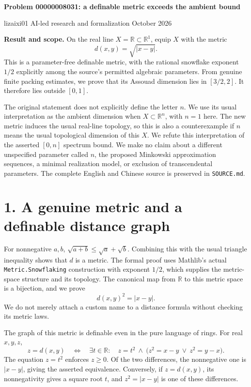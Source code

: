 \documentclass[10pt]{article}
\newcommand{\R}{\mathbb R}
\begin{document}
\begin{center}
{\Large\bfseries Problem 00000008031: a definable metric exceeds the ambient bound}

lizaixi01 \quad AI-led research and formalization  October 2026
\end{center}
\textbf{Result and scope.} On the real line $X=\R\subset\R^1$, equip $X$ with the metric
\[
d(x,y)=\sqrt{|x-y|}.
\]
This is a parameter-free definable metric, with the rational snowflake exponent $1/2$ explicitly among the source's permitted algebraic parameters. From genuine finite packing estimates, we prove that its Assouad dimension lies in $[3/2,2]$. It therefore lies outside $[0,1]$.

The original statement does not explicitly define the letter $n$. We use its usual interpretation as the ambient dimension when $X\subset\R^n$, with $n=1$ here. The new metric induces the usual real-line topology, so this is also a counterexample if $n$ means the usual topological dimension of this $X$. We refute this interpretation of the asserted $[0,n]$ spectrum bound. We make no claim about a different unspecified parameter called $n$, the proposed Minkowski approximation sequences, a minimal realization model, or exclusion of transcendental parameters. The complete English and Chinese source is preserved in \texttt{SOURCE.md}.

\section*{1. A genuine metric and a definable distance graph}
For nonnegative $a,b$, $\sqrt{a+b}\le\sqrt a+\sqrt b$. Combining this with the usual triangle inequality shows that $d$ is a metric. The formal proof uses Mathlib's actual \texttt{Metric.Snowflaking} construction with exponent $1/2$, which supplies the metric-space structure and its topology. The canonical map from $\R$ to this metric space is a bijection, and we prove
\[
d(x,y)^2=|x-y|.
\]
We do not merely attach a custom name to a distance formula without checking its metric laws.

The graph of this metric is definable even in the pure language of rings. For real $x,y,z$,
\[
z=d(x,y)\quad\Longleftrightarrow\quad
\exists t\in\R:\quad z=t^2\ \wedge\
\bigl(z^2=x-y\ \vee\ z^2=y-x\bigr).
\]
The equation $z=t^2$ enforces $z\ge0$. Of the two differences, the nonnegative one is $|x-y|$, giving the asserted equivalence. Conversely, if $z=d(x,y)$, its nonnegativity gives a square root $t$, and $z^2=|x-y|$ is one of these differences.
\end{document}
